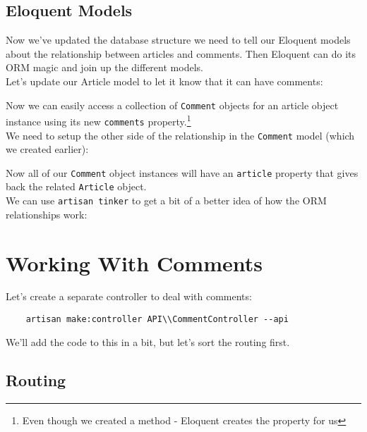 \subsection{Eloquent Models}

Now we've updated the database structure we need to tell our Eloquent models about the relationship between articles and comments. Then Eloquent can do its ORM magic and join up the different models.
\\

Let's update our Article model to let it know that it can have comments:


Now we can easily access a collection of \texttt{Comment} objects for an article object instance using its new \texttt{comments} property.\footnote{Even though we created a method - Eloquent creates the property for us}
\\

We need to setup the other side of the relationship in the \texttt{Comment} model (which we created earlier):


Now all of our \texttt{Comment} object instances will have an \texttt{article} property that gives back the related \texttt{Article} object.
\\

We can use \texttt{artisan tinker} to get a bit of a better idea of how the ORM relationships work:



\section{Working With Comments}

Let's create a separate controller to deal with comments:

\begin{verbatim}
    artisan make:controller API\\CommentController --api
\end{verbatim}

We'll add the code to this in a bit, but let's sort the routing first.


\subsection{Routing}

